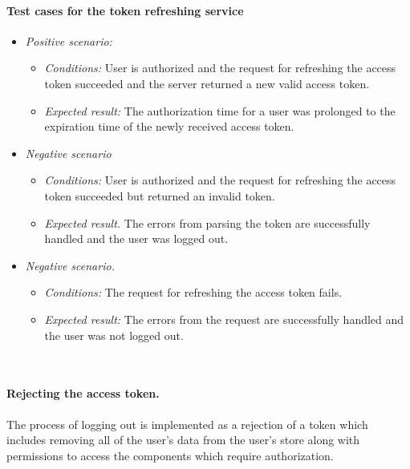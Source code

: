 \paragraph*{Test cases for the token refreshing service} 
\begin{itemize}
    \item \emph{Positive scenario:} 
        \begin{itemize}
            \item \emph{Conditions:} User is authorized and the request for refreshing the access token succeeded and the server returned a new valid access token.
            \item \emph{Expected result:} The authorization time for a user was prolonged to the expiration time of the newly received access token.
        \end{itemize}
    \item \emph{Negative scenario} 
        \begin{itemize}
            \item \emph{Conditions:} User is authorized and the request for refreshing the access token succeeded but returned an invalid token.
            \item \emph{Expected result.} The errors from parsing the token are successfully handled and the user was logged out.
        \end{itemize}
    \item \emph{Negative scenario.} 
        \begin{itemize}
            \item \emph{Conditions:} The request for refreshing the access token fails.
            \item \emph{Expected result:} The errors from the request are successfully handled and the user was not logged out.
        \end{itemize}
\end{itemize}

\


\paragraph*{Rejecting the access token.}The process of logging out is implemented as a rejection of a token which includes removing all of the user's data from the user's store along with permissions to access the components which require authorization.

